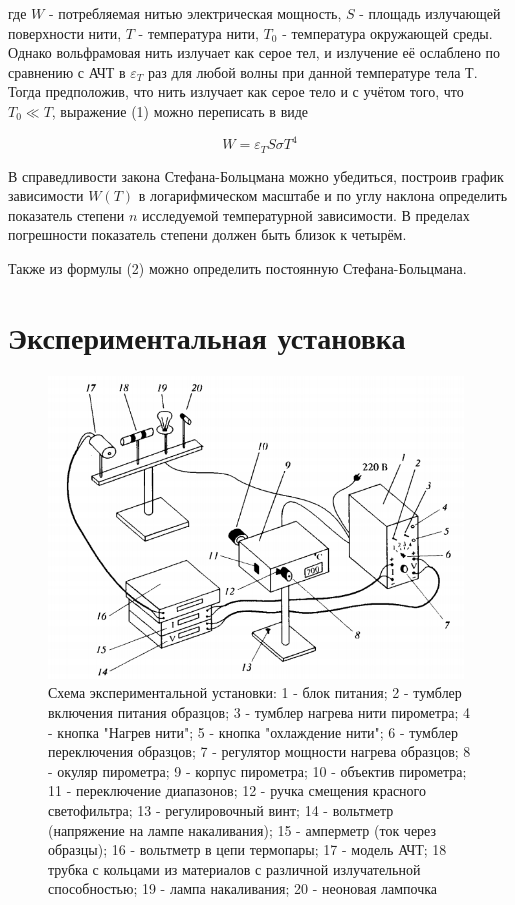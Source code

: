 \documentclass[a4paper, 12pt]{article}
\begin{document}
где $W$ - потребляемая нитью электрическая мощность, $S$ - площадь излучающей поверхности нити, $T$ - температура нити, $T_0$ - температура окружающей среды. Однако вольфрамовая нить излучает как серое тел, и излучение её ослаблено по сравнению с АЧТ в $\varepsilon_T$ раз для любой волны при данной температуре тела Т. Тогда предположив, что нить излучает как серое тело и с учётом того, что $T_0 \ll T$, выражение (1) можно переписать в виде

\begin{equation}
    W = \varepsilon_T S \sigma T^4
\end{equation}

В справедливости закона Стефана-Больцмана можно убедиться, построив график зависимости $W(T)$ в логарифмическом масштабе и по углу наклона определить показатель степени $n$ исследуемой температурной зависимости. В пределах погрешности показатель степени должен быть близок к четырём. \par
Также из формулы (2) можно определить постоянную Стефана-Больцмана.

\section*{Экспериментальная установка}

\begin{figure}[h]
    \centering
    \includegraphics[width=11cm]{fig1.PNG}
    \caption{Схема экспериментальной установки: 1 - блок питания; 2 - тумблер включения питания образцов; 3 - тумблер нагрева нити пирометра; 4 - кнопка "Нагрев нити"; 5 - кнопка "охлаждение нити"; 6 - тумблер переключения образцов; 7 - регулятор мощности нагрева образцов; 8 - окуляр пирометра; 9 - корпус пирометра; 10 - объектив пирометра; 11 - переключение диапазонов; 12 - ручка смещения красного светофильтра; 13 - регулировочный винт; 14 - вольтметр (напряжение на лампе накаливания); 15 - амперметр (ток через образцы); 16 - вольтметр в цепи термопары; 17 - модель АЧТ; 18 трубка с кольцами из материалов с различной излучательной способностью; 19 - лампа накаливания; 20 - неоновая лампочка}
    \label{fig:vac}
\end{figure}
\end{document}
